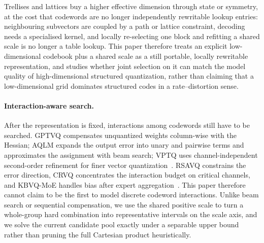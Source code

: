 Trellises and lattices buy a higher effective dimension through state or symmetry, at the cost that codewords are no longer independently rewritable lookup entries: neighbouring subvectors are coupled by a path or lattice constraint, decoding needs a specialised kernel, and locally re-selecting one block and refitting a shared scale is no longer a table lookup.
This paper therefore treats an explicit low-dimensional codebook plus a shared scale as a still portable, locally rewritable representation, and studies whether joint selection on it can match the model quality of high-dimensional structured quantization, rather than claiming that a low-dimensional grid dominates structured codes in a rate--distortion sense.

\paragraph{Interaction-aware search.}
After the representation is fixed, interactions among codewords still have to be searched.
GPTVQ compensates unquantized weights column-wise with the Hessian; AQLM expands the output error into unary and pairwise terms and approximates the assignment with beam search; VPTQ uses channel-independent second-order refinement for finer vector quantization~\cite{gptvq,aqlm,vptq}.
RSAVQ constrains the error direction, CRVQ concentrates the interaction budget on critical channels, and KBVQ-MoE handles bias after expert aggregation~\cite{rsavq,crvq,kbvqmoe}.
This paper therefore cannot claim to be the first to model discrete codeword interactions.
Unlike beam search or sequential compensation, we use the shared positive scale to turn a whole-group hard combination into representative intervals on the scale axis, and we solve the current candidate pool exactly under a separable upper bound rather than pruning the full Cartesian product heuristically.

